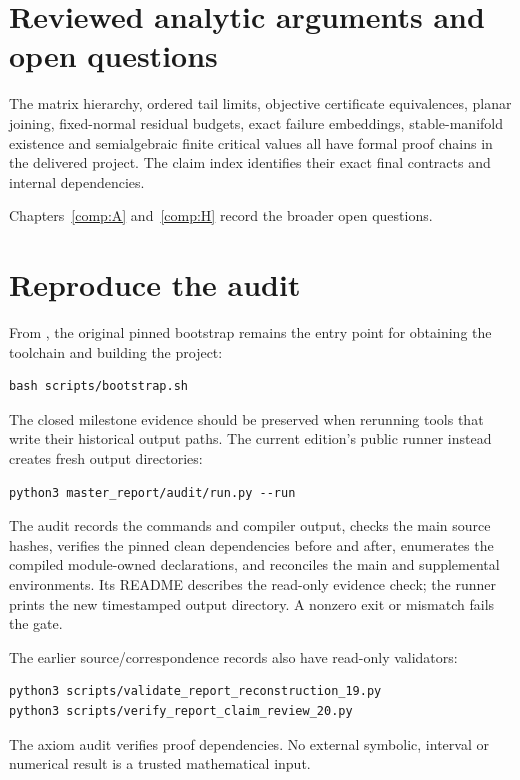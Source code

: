 

\section{Reviewed analytic arguments and open questions}\label{analytic-steps-that-still-require-independent-review}

The matrix hierarchy, ordered tail limits, objective certificate equivalences, planar joining, fixed-normal residual budgets, exact failure embeddings, stable-manifold existence and semialgebraic finite critical values all have formal proof chains in the delivered project. The claim index identifies their exact final contracts and internal dependencies.

Chapters~\ref{comp:A} and~\ref{comp:H} record the broader open questions.



\section{Reproduce the audit}\label{reproduce-the-audit}

From , the original pinned bootstrap remains the entry point for obtaining the toolchain and building the project:
\begin{verbatim}
bash scripts/bootstrap.sh
\end{verbatim}
The closed milestone evidence should be preserved when rerunning tools that write their historical output paths. The current edition's public runner instead creates fresh output directories:
\begin{verbatim}
python3 master_report/audit/run.py --run
\end{verbatim}
The audit records the commands and compiler output, checks the main source hashes, verifies the pinned clean dependencies before and after, enumerates the compiled module-owned declarations, and reconciles the main and supplemental environments. Its README describes the read-only evidence check; the runner prints the new timestamped output directory. A nonzero exit or mismatch fails the gate.

The earlier source/correspondence records also have read-only validators:
\begin{verbatim}
python3 scripts/validate_report_reconstruction_19.py
python3 scripts/verify_report_claim_review_20.py
\end{verbatim}
The axiom audit verifies proof dependencies. No external symbolic, interval or numerical result is a trusted mathematical input.

